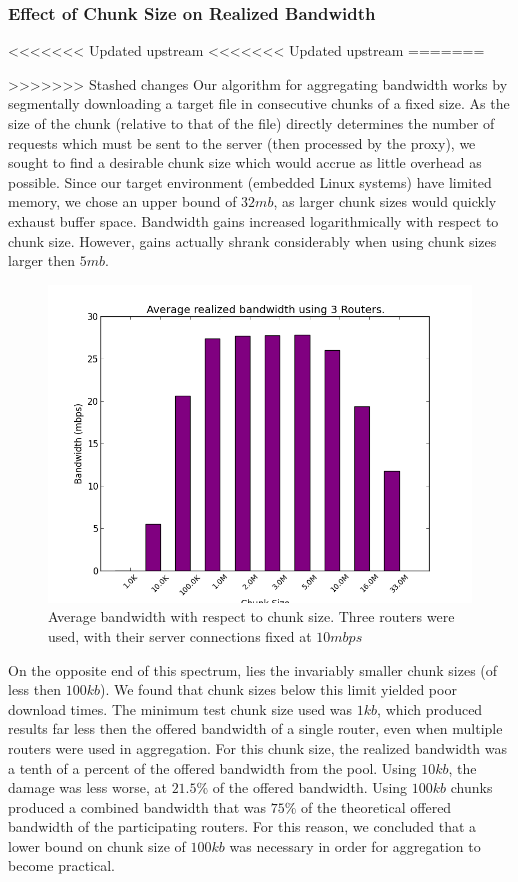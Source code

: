 \documentclass[12pt]{article}
\begin{document}
	\subsubsection{Effect of Chunk Size on Realized Bandwidth}
<<<<<<< Updated upstream
<<<<<<< Updated upstream
=======

>>>>>>> Stashed changes
		Our algorithm for aggregating bandwidth works by segmentally downloading a target file in consecutive chunks of a fixed size. As the size of the chunk (relative to that of the file) directly determines the number of requests which must be sent to the server (then processed by the proxy), we sought to find a desirable chunk size which would accrue as little overhead as possible. Since our target environment (embedded Linux systems) have limited memory, we chose an upper bound of $32 mb$, as larger chunk sizes would quickly exhaust buffer space. Bandwidth gains increased logarithmically with respect to chunk size. However, gains actually shrank considerably when using chunk sizes larger then $5 mb$. 
		
		\begin{figure}[H]
			\centering
			\includegraphics[keepaspectratio=true,scale=0.5]{all_sizes.png}
			\caption{Average bandwidth with respect to chunk size. Three routers were used, with their server connections fixed at $10 mbps$}
		\end{figure}

		On the opposite end of this spectrum, lies the invariably smaller chunk sizes (of less then $100 kb$). We found that chunk sizes below this limit yielded poor download times. The minimum test chunk size used was $1 kb$, which produced results far less then the offered bandwidth of a single router, even when multiple routers were used in aggregation. For this chunk size, the realized bandwidth was a tenth of a percent of the offered bandwidth from the pool. Using $10 kb$, the damage was less worse, at $21.5\%$ of the offered bandwidth. Using $100 kb$ chunks produced a combined bandwidth that was $75\%$ of the theoretical offered bandwidth of the participating routers. For this reason, we concluded that a lower bound on chunk size of $100 kb$ was necessary in order for aggregation to become practical.
\end{document}
